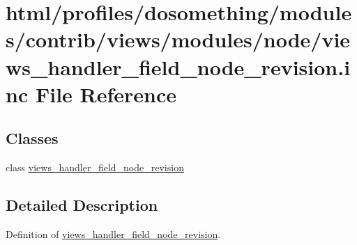 \hypertarget{views__handler__field__node__revision_8inc}{
\section{html/profiles/dosomething/modules/contrib/views/modules/node/views\_\-handler\_\-field\_\-node\_\-revision.inc File Reference}
\label{views__handler__field__node__revision_8inc}
}
\subsection*{Classes}
\begin{DoxyCompactItemize}
\item 
class \hyperlink{classviews__handler__field__node__revision}{views\_\-handler\_\-field\_\-node\_\-revision}
\end{DoxyCompactItemize}


\subsection{Detailed Description}
Definition of \hyperlink{classviews__handler__field__node__revision}{views\_\-handler\_\-field\_\-node\_\-revision}. 
